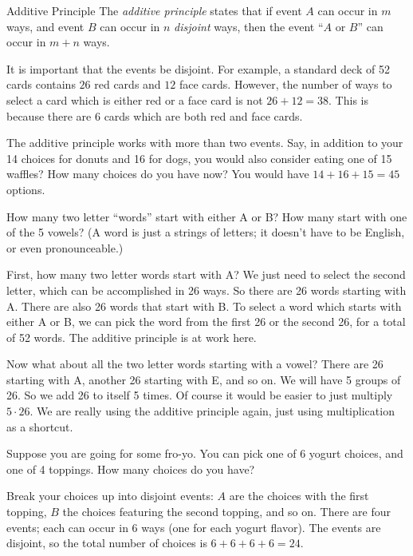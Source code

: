 \documentclass[12pt]{article}
\begin{document}
\begin{defbox}{Additive Principle}
  The {\em additive principle} states that if event $A$ can occur in $m$ ways, and event $B$ can occur in $n$ {\em disjoint} ways, then the event ``$A$ or $B$'' can occur in $m + n$ ways.
\end{defbox}

It is important that the events be disjoint.  For example, a standard deck of 52 cards contains $26$ red cards and $12$ face cards.  However, the number of ways to select a card which is either red or a face card is not $26 + 12 = 38$.  This is because there are 6 cards which are both red and face cards.

The additive principle works with more than two events.  Say, in addition to your 14 choices for donuts and 16 for dogs, you would also consider eating one of 15 waffles?  How many choices do you have now?  You would have $14 + 16 + 15 = 45$ options.

\begin{example}
  How many two letter ``words'' start with either A or B?  How many start with one of the 5 vowels?  (A word is just a strings of letters; it doesn't have to be English, or even pronounceable.)

  \begin{solution}
    First, how many two letter words start with A?  We just need to select the second letter, which can be accomplished in 26 ways.  So there are 26 words starting with A.  There are also 26 words that start with B.  To select a word which starts with either A or B, we can pick the word from the first 26 or the second 26, for a total of 52 words.  The additive principle is at work here.

    Now what about all the two letter words starting with a vowel?  There are 26 starting with A, another 26 starting with E, and so on.  We will have 5 groups of 26.  So we add 26 to itself 5 times.  Of course it would be easier to just multiply $5\cdot 26$.  We are really using the additive principle again, just using multiplication as a shortcut.
  \end{solution}

\end{example}

\begin{example}
  Suppose you are going for some fro-yo.  You can pick one of 6 yogurt choices, and one of 4 toppings.  How many choices do you have?

  \begin{solution}
    Break your choices up into disjoint events:  $A$ are the choices with the first topping, $B$ the choices featuring the second topping, and so on.  There are four events; each can occur in 6 ways (one for each yogurt flavor).  The events are disjoint, so the total number of choices is $6 + 6 + 6 + 6 = 24$.
  \end{solution}


\end{example}
\end{document}
